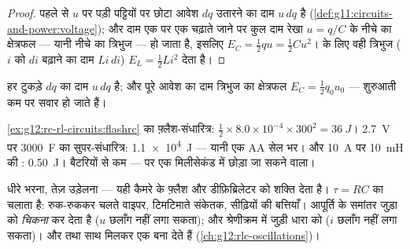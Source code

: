 \begin{proof}
पहले से $u$  पर पड़ी पट्टियों पर छोटा आवेश $dq$ उतारने
का दाम $u\,dq$ है (\cref{def:g11:circuits-and-power:voltage}); और दाम एक पर एक चढ़ाते जाने पर कुल दाम रेखा
$u = q/C$ के नीचे का क्षेत्रफल --- यानी नीचे का त्रिभुज --- हो जाता है, इसलिए
$E_C = \tfrac12 qu = \tfrac12 Cu^2$।  के लिए वही त्रिभुज ($i$ को $di$ बढ़ाने का दाम
$Li\,di$) $E_L = \tfrac12 Li^2$ देता है।
\end{proof}

\begin{omfigure}

{\small हर टुकड़े $dq$ का दाम $u\,dq$ है; और पूरे आवेश का दाम त्रिभुज का
क्षेत्रफल $E_C = \tfrac12 q_0 u_0$ --- शुरुआती  कम  पर सवार हो
जाते हैं।}
\end{omfigure}

\begin{example}[ऊर्जा की परिमाण-कोटियाँ]\label{ex:g12:rc-rl-circuits:energies}
\cref{ex:g12:rc-rl-circuits:flashrc} का फ़्लैश-संधारित्र: $\tfrac12 \times 8.0\times10^{-4} \times 300^2 = \qty{36}{J}$। \qty{2.7}{V} पर \qty{3000}{F} का
सुपर-संधारित्र: \qty{1.1e4}{J} --- यानी एक AA सेल भर। और \qty{10}{A} पर \qty{10}{mH} की
: \qty{0.50}{J}। बैटरियों से कम --- पर एक मिलीसेकंड में छोड़ा जा सकने
वाला।
\end{example}

\begin{remark}[ये दोनों समय-रक्षक किस काम के हैं]\label{rem:g12:rc-rl-circuits:applications}
धीरे भरना, तेज़ उड़ेलना --- यही कैमरे के फ़्लैश और डीफ़िब्रिलेटर को
शक्ति देता है। $\tau = RC$ का  
चलाता है: रुक-रुककर चलते वाइपर, टिमटिमाते संकेतक, सीढ़ियों की बत्तियाँ। आपूर्ति
के समांतर जुड़ा   को \emph{चिकना} कर देता है
($u$ छलाँग नहीं लगा सकता); और श्रेणीक्रम में जुड़ी  धारा को
($i$ छलाँग नहीं लगा सकता)। और  तथा  साथ
मिलकर एक  बना देते हैं (\cref{ch:g12:rlc-oscillations})।
\end{remark}

